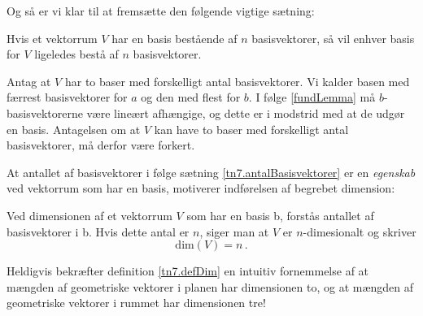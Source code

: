 Og så er vi klar til at fremsætte den følgende vigtige sætning:

\begin{theorem}\label{tn7.antalBasisvektorer}
Hvis et vektorrum $V$ har en basis bestående af $n$ basisvektorer, så vil enhver basis for $V$ ligeledes bestå af $n$ basisvektorer.
\end{theorem}

\begin{bevis}
Antag at $V$ har to baser med forskelligt antal basisvektorer. Vi kalder basen med færrest basisvektorer for $a$ og den med flest for $b$. I følge \ref{fundLemma} må $b$-basisvektorerne være lineært afhængige, og dette er i modstrid med at de udgør en basis. Antagelsen om at $V$ kan have to baser med forskelligt antal basisvektorer, må derfor være forkert.
\end{bevis}

At antallet af basisvektorer i følge sætning \ref{tn7.antalBasisvektorer} er en \textit{egenskab} ved vektorrum som har en basis, motiverer indførelsen af begrebet dimension:

\begin{definition}[Dimension]\label{tn7.defDim}
Ved dimensionen af et vektorrum $V$ som har en basis b, forstås antallet af basisvektorer i b. Hvis dette antal er $n$, siger man at $V$ er $n$-dimesionalt og skriver
\begin{equation}
\mathrm{dim}(V)=n\,.
\end{equation}
\end{definition}

\begin{example}
Heldigvis bekræfter definition \ref{tn7.defDim} en intuitiv fornemmelse af at mængden af geometriske vektorer i planen har dimensionen to, og at mængden af geometriske vektorer i rummet har dimensionen tre!
\end{example}

